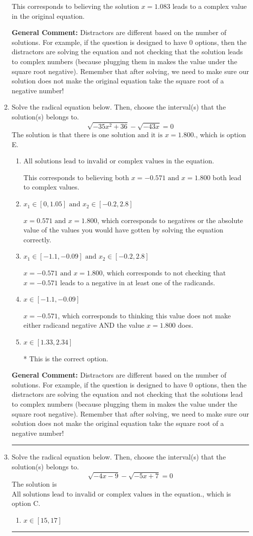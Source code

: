 \documentclass{extbook}[14pt]
\newcommand{\litem}[1]{\item #1

\rule{\textwidth}{0.4pt}}
\begin{document}
\begin{enumerate}
{\begin{enumerate}[label=\Alph*.]
This corresponds to believing the solution $x = 1.083$ leads to a complex value in the original equation.
\end{enumerate}

\textbf{General Comment:} Distractors are different based on the number of solutions. For example, if the question is designed to have 0 options, then the distractors are solving the equation and not checking that the solution leads to complex numbers (because plugging them in makes the value under the square root negative). Remember that after solving, we need to make sure our solution does not make the original equation take the square root of a negative number!
}
\litem{
Solve the radical equation below. Then, choose the interval(s) that the solution(s) belongs to.
\[ \sqrt{-35 x^2 + 36} - \sqrt{-43 x} = 0 \]The solution is \( \text{that there is one solution and it is } x = 1.800. \), which is option E.\begin{enumerate}[label=\Alph*.]
\item \( \text{All solutions lead to invalid or complex values in the equation.} \)

This corresponds to believing both $x = -0.571 \text{ and } x = 1.800$ both lead to complex values.
\item \( x_1 \in [0, 1.05] \text{ and } x_2 \in [-0.2,2.8] \)

$x = 0.571 \text{ and } x = 1.800$, which corresponds to negatives or the absolute value of the values you would have gotten by solving the equation correctly.
\item \( x_1 \in [-1.1, -0.09] \text{ and } x_2 \in [-0.2,2.8] \)

$x = -0.571 \text{ and } x = 1.800$, which corresponds to not checking that $x = -0.571$ leads to a negative in at least one of the radicands.
\item \( x \in [-1.1,-0.09] \)

$x = -0.571$, which corresponds to thinking this value does not make either radicand negative AND the value $x = 1.800$ does.
\item \( x \in [1.33,2.34] \)

* This is the correct option.
\end{enumerate}

\textbf{General Comment:} Distractors are different based on the number of solutions. For example, if the question is designed to have 0 options, then the distractors are solving the equation and not checking that the solutions lead to complex numbers (because plugging them in makes the value under the square root negative). Remember that after solving, we need to make sure our solution does not make the original equation take the square root of a negative number!
}
\litem{
Solve the radical equation below. Then, choose the interval(s) that the solution(s) belongs to.
\[ \sqrt{-4 x - 9} - \sqrt{-5 x + 7} = 0 \]The solution is \( \text{All solutions lead to invalid or complex values in the equation.} \), which is option C.\begin{enumerate}[label=\Alph*.]
\item \( x \in [15,17] \)


\end{enumerate}}
\end{enumerate}
\end{document}
